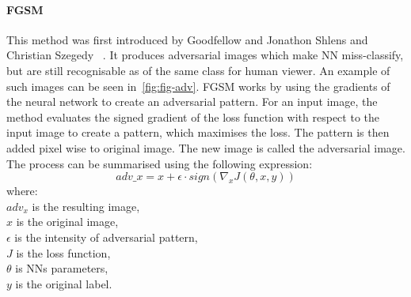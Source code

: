 \paragraph{FGSM}
This method was first introduced by Goodfellow and Jonathon Shlens and Christian Szegedy
~\cite{goodfellow2015explaining}.
It produces adversarial images which make NN miss-classify,
but are still recognisable as of the same class for human viewer.
An example of such images can be seen in~\ref{fig:fig-adv}.
FGSM works by using the gradients of the neural network to create an adversarial pattern.
For an input image,
the method evaluates the signed gradient of the loss function with respect to the input image to create a pattern,
which maximises the loss.
The pattern is then added pixel wise to original image.
The new image is called the adversarial image.
The process can be summarised using the following expression:
\begin{equation}
    adv\_x = x + \epsilon \cdot sign(\nabla_x J(\theta, x, y))
\end{equation}
where: \\
$adv_x$ is the resulting image, \\
$x$ is the original image, \\
$\epsilon$ is the intensity of adversarial pattern, \\
$J$ is the loss function, \\
$\theta$ is NNs parameters, \\
$y$ is the original label.
\\
